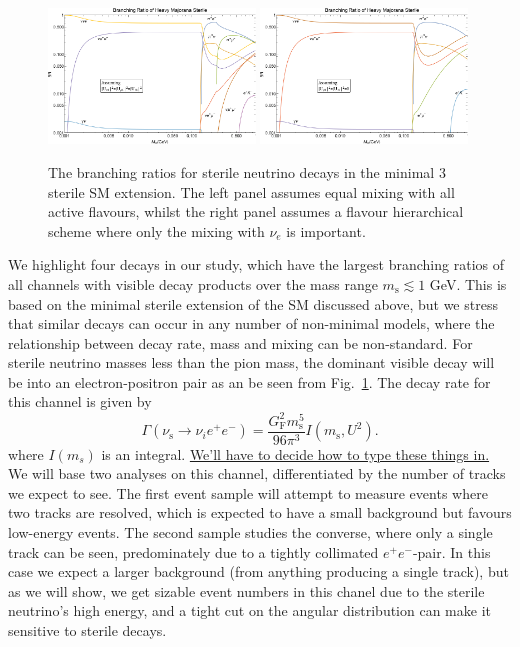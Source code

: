 \documentclass[11pt, a4paper]{article}
\newcommand{\reffig}[1]{Fig.~\ref{#1}}
\newcommand{\newtext}[2]{\textcolor{#1}{\ul{#2}}}
\begin{document}
\begin{figure}[t]
\includegraphics[width=0.49\textwidth]{figures/bounds1.pdf}  \includegraphics[width=0.49\textwidth]{figures/bounds2.pdf}
\caption{\label{fig:branchingratios}The branching ratios for sterile neutrino decays in the minimal 3 sterile SM extension. The left panel assumes equal mixing with all active flavours, whilst the right panel assumes a flavour hierarchical scheme where only the mixing with $\nu_e$ is important.}
\end{figure}

We highlight four decays in our study, which have the largest branching ratios
of all channels with visible decay products over the mass range $m_\text{s}
\lesssim 1$ GeV. This is based on the minimal sterile extension of the SM
discussed above, but we stress that similar decays can occur in any number of
non-minimal models, where the relationship between decay rate, mass and mixing
can be non-standard. For sterile neutrino masses less than the pion mass, the
dominant visible decay will be into an electron-positron pair as an be seen
from \reffig{fig:branchingratios}. The decay rate for this channel is given by 
%
\[ \Gamma\left(\nu_\text{s}\to \nu_i e^+e^-\right) =
\frac{G_\text{F}^2m_\text{s}^5}{96\pi^3}I(m_\text{s}, U^2).  \]
%
where $I(m_s)$ is an integral. \newtext{PB}{We'll have to decide how to type these things in.}
%
We will base two analyses on this channel, differentiated by the number of
tracks we expect to see. The first event sample will attempt to measure events
where two tracks are resolved, which is expected to have a small background but
favours low-energy events. The second sample studies the converse, where only a
single track can be seen, predominately due to a tightly collimated
$e^+e^-$-pair. In this case we expect a larger background (from anything
producing a single track), but as we will show, we get sizable event numbers in
this chanel due to the sterile neutrino's high energy, and a tight cut on the
angular distribution can make it sensitive to sterile decays.
\end{document}
